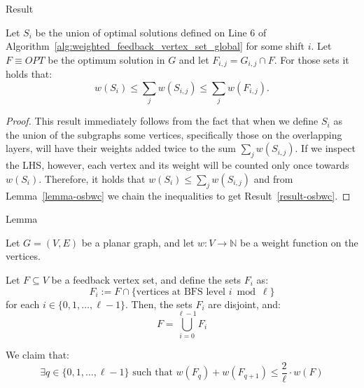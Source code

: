 \begin{mydefinition}{Result}
    \label{result-osbwc}

    Let $S_i$ be the union of optimal solutions defined on Line 6 of Algorithm~\ref{alg:weighted_feedback_vertex_set_global} 
    for some shift $i$.
    Let $F \equiv OPT$ be the optimum solution in $G$ and let $F_{i, j} = G_{i, j} \cap F$.
    For those sets it holds that: \[w(S_{i}) \leq \sum\limits_{j} w(S_{i, j}) \leq \sum\limits_{j} w(F_{i, j}) \text{.}\]  

\end{mydefinition}


\begin{proof}
    
This result immediately follows from the fact that when we define $S_i$ as the union of the subgraphs 
some vertices, specifically those on the overlapping layers, will have their weights added twice 
to the sum $\sum\limits_{j} w(S_{i, j})$. If we inspect the LHS, however, each vertex and its weight will be 
counted only once towards $w(S_i)$. Therefore, it holds that $w(S_i) \leq \sum\limits_{j} w(S_{i, j})$ 
and from Lemma~\ref{lemma-osbwc} we chain the inequalities to get Result~\ref{result-osbwc}.

\end{proof}

\begin{mydefinition}{Lemma}
\label{lemma-bvweighted_feedback_vertex_set_global}

Let \( G = (V, E) \) be a planar graph, and let \( w : V \rightarrow \mathbb{N} \) be a weight function on the vertices. 

Let \( F \subseteq V \) be a feedback vertex set, and define the sets \( F_i \) as:
\[
F_i := F \cap \{ \text{vertices at BFS level } i \bmod \ell \}
\]
for each \( i \in \{0, 1, \dots, \ell - 1\} \). Then, the sets \( F_i \) are disjoint, and:
\[
F = \bigcup_{i = 0}^{\ell - 1} F_i
\]

We claim that:
\[
\exists q \in \{0, 1, \dots, \ell - 1\} \text{ such that } w(F_q) + w(F_{q+1}) \leq \frac{2}{\ell} \cdot w(F)
\]
\end{mydefinition}

